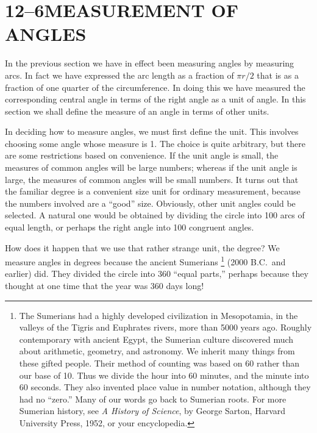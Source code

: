 \documentclass[11pt]{book}
\theoremstyle{bkplain}
\theoremstyle{XIplainnote}
\theoremstyle{bkplain}
\newcommand{\XIIsymfoot}[1]{%
  \begingroup
  \renewcommand{\thefootnote}{\fnsymbol{footnote}}%
  \setcounter{footnote}{0}%
  \footnote{#1}%
  \endgroup}
\theoremstyle{bkplain}
\begin{document}
\section*{12--6\quad MEASUREMENT OF ANGLES}

In the previous section we have in effect been measuring angles by measuring
arcs. In fact we have expressed the arc length as a fraction of $\pi r/2$ that
is as a fraction of one quarter of the circumference. In doing this we have
measured the corresponding central angle in terms of the right angle as a unit
of angle. In this section we shall define the measure of an angle in terms of
other units.

In deciding how to measure angles, we must first define the unit. This involves
choosing some angle whose measure is 1. The choice is quite arbitrary, but there
are some restrictions based on convenience. If the unit angle is small, the
measures of common angles will be large numbers; whereas if the unit angle is
large, the measures of common angles will be small numbers. It turns out that
the familiar degree is a convenient size unit for ordinary measurement, because
the numbers involved are a ``good'' size. Obviously, other unit angles could be
selected. A natural one would be obtained by dividing the circle into 100 arcs
of equal length, or perhaps the right angle into 100 congruent angles.

How does it happen that we use that rather strange unit, the degree? We measure
angles in degrees because the ancient Sumerians\XIIsymfoot{The Sumerians had a
highly developed civilization in Mesopotamia, in the valleys of the Tigris and
Euphrates rivers, more than 5000 years ago. Roughly contemporary with ancient
Egypt, the Sumerian culture discovered much about arithmetic, geometry, and
astronomy. We inherit many things from these gifted people. Their method of
counting was based on 60 rather than our base of 10. Thus we divide the hour
into 60 minutes, and the minute into 60 seconds. They also invented place value
in number notation, although they had no ``zero.'' Many of our words go back to
Sumerian roots. For more Sumerian history, see \emph{A History of Science}, by
George Sarton, Harvard University Press, 1952, or your encyclopedia.} (2000
B.C.\ and earlier) did. They divided the circle into 360 ``equal parts,''
perhaps because they thought at one time that the year was 360 days long!
\end{document}
